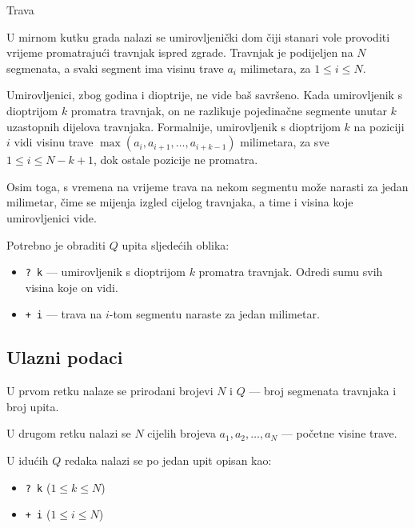 \begin{statement}[
  problempoints=100,
  timelimit=1 sekunda,
  memorylimit=512 MiB,
]{Trava}\

U mirnom kutku grada nalazi se umirovljenički dom čiji stanari vole provoditi vrijeme promatrajući travnjak ispred zgrade. Travnjak je podijeljen na $N$ segmenata, a svaki segment ima visinu trave $a_i$ milimetara, za $1 \leq i \leq N$.

Umirovljenici, zbog godina i dioptrije, ne vide baš savršeno. Kada umirovljenik s dioptrijom $k$ promatra travnjak, on ne razlikuje pojedinačne segmente unutar $k$ uzastopnih dijelova travnjaka. Formalnije, umirovljenik s dioptrijom $k$ na poziciji $i$ vidi visinu trave $\max(a_i, a_{i+1}, \ldots, a_{i+k-1})$ milimetara, za sve $1 \leq i \leq N - k + 1$, dok ostale pozicije ne promatra.

Osim toga, s vremena na vrijeme trava na nekom segmentu može narasti za jedan milimetar, čime se mijenja izgled cijelog travnjaka, a time i visina koje umirovljenici vide.

Potrebno je obraditi $Q$ upita sljedećih oblika:
\vspace{-0.7em}
\begin{itemize}
    \item \texttt{\frenchspacing? k} — umirovljenik s dioptrijom $k$ promatra travnjak. Odredi sumu svih visina koje on vidi.
    \item \texttt{+ i} — trava na $i$-tom segmentu naraste za jedan milimetar.
\end{itemize}

\subsection*{Ulazni podaci}

U prvom retku nalaze se prirodani brojevi $N$ i $Q$ — broj segmenata travnjaka i broj upita.

U drugom retku nalazi se $N$ cijelih brojeva $a_1, a_2, \ldots, a_N$ — početne visine trave.

U idućih $Q$ redaka nalazi se po jedan upit opisan kao:
\vspace{-0.7em}
\begin{itemize}
    \item \texttt{\frenchspacing? k} ($1 \leq k \leq N$)
    \item \texttt{+ i} ($1 \leq i \leq N$)
\end{itemize}


\end{statement}
